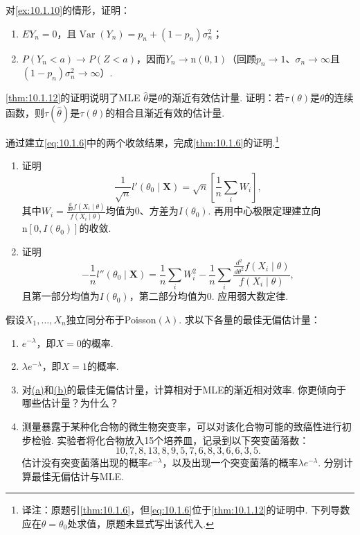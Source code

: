 \begin{exercise}\label{exercise:10.6}
对\autoref{ex:10.1.10}的情形，证明：
\begin{enumerate}[label=(\alph*)]
\item $EY_n=0$，且$\operatorname{Var}(Y_n)=p_n+(1-p_n)\sigma_n^2$；
\item $P(Y_n<a)\to P(Z<a)$，因而$Y_n\to\mathrm n(0,1)$（回顾$p_n\to1$、$\sigma_n\to\infty$且$(1-p_n)\sigma_n^2\to\infty$）.
\end{enumerate}
\end{exercise}

\begin{exercise}\label{exercise:10.7}
\autoref{thm:10.1.12}的证明说明了MLE $\hat\theta$是$\theta$的渐近有效估计量. 证明：若$\tau(\theta)$是$\theta$的连续函数，则$\tau(\hat\theta)$是$\tau(\theta)$的相合且渐近有效的估计量.
\end{exercise}

\begin{exercise}\label{exercise:10.8}
通过建立\eqref{eq:10.1.6}中的两个收敛结果，完成\autoref{thm:10.1.6}的证明.\footnote{译注：原题引\autoref{thm:10.1.6}，但\eqref{eq:10.1.6}位于\autoref{thm:10.1.12}的证明中. 下列导数应在$\theta=\theta_0$处求值，原题未显式写出该代入.}
\begin{enumerate}[label=(\alph*)]
\item 证明
$$\frac1{\sqrt n}l'(\theta_0\mid\boldsymbol X)=\sqrt n\left[\frac1n\sum_iW_i\right],$$
其中$W_i=\frac{\frac d{d\theta}f(X_i\mid\theta)}{f(X_i\mid\theta)}$均值为0、方差为$I(\theta_0)$. 再用中心极限定理建立向$\mathrm n[0,I(\theta_0)]$的收敛.
\item 证明
$$-\frac1n l''(\theta_0\mid\boldsymbol X)=\frac1n\sum_iW_i^2-\frac1n\sum_i\frac{\frac{d^2}{d\theta^2}f(X_i\mid\theta)}{f(X_i\mid\theta)},$$
且第一部分均值为$I(\theta_0)$，第二部分均值为0. 应用弱大数定律.
\end{enumerate}
\end{exercise}

\begin{exercise}\label{exercise:10.9}
假设$X_1,\ldots,X_n$独立同分布于Poisson$(\lambda)$. 求以下各量的最佳无偏估计量：
\begin{enumerate}[label=(\alph*)]
\item\label{item:10.9.a} $e^{-\lambda}$，即$X=0$的概率.
\item\label{item:10.9.b} $\lambda e^{-\lambda}$，即$X=1$的概率.
\item 对\hyperref[item:10.9.a]{(a)}和\hyperref[item:10.9.b]{(b)}的最佳无偏估计量，计算相对于MLE的渐近相对效率. 你更倾向于哪些估计量？为什么？
\item 测量暴露于某种化合物的微生物突变率，可以对该化合物可能的致癌性进行初步检验. 实验者将化合物放入15个培养皿，记录到以下突变菌落数：
$$10,7,8,13,8,9,5,7,6,8,3,6,6,3,5.$$
估计没有突变菌落出现的概率$e^{-\lambda}$，以及出现一个突变菌落的概率$\lambda e^{-\lambda}$. 分别计算最佳无偏估计与MLE.
\end{enumerate}
\end{exercise}

